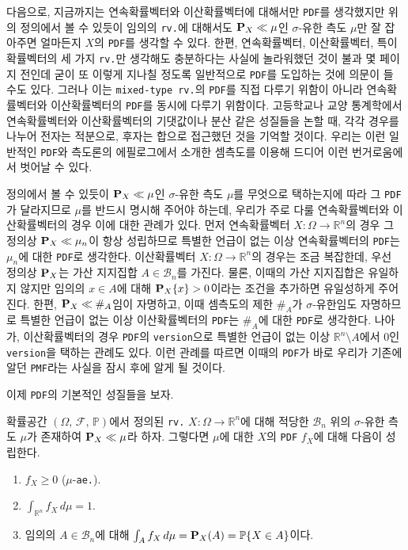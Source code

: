 다음으로, 지금까지는 연속확률벡터와 이산확률벡터에 대해서만 \texttt{PDF}를 생각했지만 위의 정의에서 볼 수 있듯이 임의의 \texttt{rv.}에 대해서도 $\mathbf{P}_X\ll\mu$인 $\sigma$-유한 측도 $\mu$만 잘 잡아주면 얼마든지 $X$의 \texttt{PDF}를 생각할 수 있다. 한편, 연속확률벡터, 이산확률벡터, 특이확률벡터의 세 가지 \texttt{rv.}만 생각해도 충분하다는 사실에 놀라워했던 것이 불과 몇 페이지 전인데 굳이 또 이렇게 지나칠 정도록 일반적으로 \texttt{PDF}를 도입하는 것에 의문이 들 수도 있다. 그러나 이는 \texttt{mixed-type rv.}의 \texttt{PDF}를 직접 다루기 위함이 아니라 연속확률벡터와 이산확률벡터의 \texttt{PDF}를 동시에 다루기 위함이다. 고등학교나 교양 통계학에서 연속확률벡터와 이산확률벡터의 기댓값이나 분산 같은 성질들을 논할 때, 각각 경우를 나누어 전자는 적분으로, 후자는 합으로 접근했던 것을 기억할 것이다. 우리는 이런 일반적인 \texttt{PDF}와 측도론의 에필로그에서 소개한 셈측도를 이용해 드디어 이런 번거로움에서 벗어날 수 있다.

정의에서 볼 수 있듯이 $\mathbf{P}_X\ll\mu$인 $\sigma$-유한 측도 $\mu$를 무엇으로 택하는지에 따라 그 \texttt{PDF}가 달라지므로 $\mu$를 반드시 명시해 주어야 하는데, 우리가 주로 다룰 연속확률벡터와 이산확률벡터의 경우 이에 대한 관례가 있다. 먼저 연속확률벡터 $X:\Omega\to\mathbb{R}^n$의 경우 그 정의상 $\mathbf{P}_X\ll\mu_n$이 항상 성립하므로 특별한 언급이 없는 이상 연속확률벡터의 \texttt{PDF}는 $\mu_n$에 대한 \texttt{PDF}로 생각한다. 이산확률벡터 $X:\Omega\to\mathbb{R}^n$의 경우는 조금 복잡한데, 우선 정의상 $\mathbf{P}_X$는 가산 지지집합 $A\in\mathcal{B}_n$를 가진다. 물론, 이때의 가산 지지집합은 유일하지 않지만 임의의 $x\in A$에 대해 $\mathbf{P}_X\{x\}>0$이라는 조건을 추가하면 유일성하게 주어진다. 한편, $\mathbf{P}_X\ll\#_A$임이 자명하고, 이때 셈측도의 제한 $\#_A$가 $\sigma$-유한임도 자명하므로 특별한 언급이 없는 이상 이산확률벡터의 \texttt{PDF}는 $\#_A$에 대한 \texttt{PDF}로 생각한다. 나아가, 이산확률벡터의 경우 \texttt{PDF}의 \texttt{version}으로 특별한 언급이 없는 이상 $\mathbb{R}^n\setminus A$에서 $0$인 \texttt{version}을 택하는 관례도 있다. 이런 관례를 따르면 이때의 \texttt{PDF}가 바로 우리가 기존에 알던 \texttt{PMF}라는 사실을 잠시 후에 알게 될 것이다.

이제 \texttt{PDF}의 기본적인 성질들을 보자.

\begin{theorem}
    확률공간 $(\Omega,\,\mathcal{F},\,\mathbb{P})$에서 정의된 \texttt{rv.} $X:\Omega\to\mathbb{R}^n$에 대해 적당한 $\mathcal{B}_n$ 위의 $\sigma$-유한 측도 $\mu$가 존재하여 $\mathbf{P}_X\ll\mu$라 하자. 그렇다면 $\mu$에 대한 $X$의 \texttt{PDF} $f_X$에 대해 다음이 성립한다.
    \begin{enumerate}
        \item $f_X\geq0$ ($\mu$-\texttt{ae.}).
        \item $\int_{\mathbb{R}^n}f_X\,d\mu=1$.
        \item 임의의 $A\in\mathcal{B}_n$에 대해 $\int_Af_X\,d\mu=\mathbf{P}_X(A)=\mathbb{P}\{X\in A\}$이다.
    \end{enumerate}
\end{theorem}


